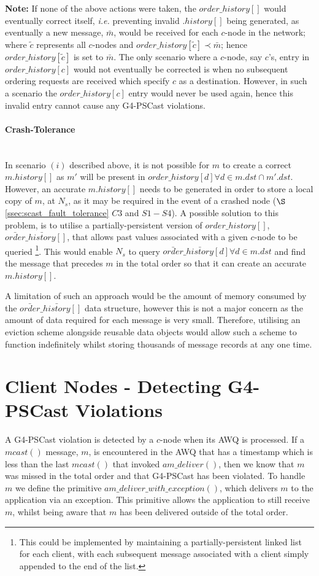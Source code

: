     \textbf{Note: } If none of the above actions were taken, the $order\_history[]$ would eventually correct itself, \emph{i.e.} preventing invalid $.history[]$ being generated, as eventually a new message, $\bar{m}$, would be received for each $c$-node in the network; where $\tilde{c}$ represents all $c$-nodes and $order\_history[\tilde{c}] \prec \bar{m}$; hence $order\_history[\tilde{c}]$ is set to $\bar{m}$.  The only scenario where a $c$-node, say $c$'s, entry in $order\_history[c]$ would not eventually be corrected is when no subsequent ordering requests are received which specify $c$ as a destination.  However, in such a scenario the $order\_history[c]$ entry would never be used again, hence this invalid entry cannot cause any G4-PSCast violations.  
    
    \paragraph{Crash-Tolerance} \hfill \\
    In scenario $(i)$ described above, it is not possible for $m$ to create a correct $m.history[]$ as $m'$ will be present in $order\_history[d] \forall d \in m.dst \cap m'.dst$.  However, an accurate $m.history[]$ needs to be generated in order to store a local copy of $m$, at $N_s$, as it may be required in the event of a crashed node ($\S$ \ref{ssec:scast_fault_tolerance} $C3$ and $S1-S4$).  A possible solution to this problem, is to utilise a partially-persistent version of $order\_history[]$, $\bar{order}\_\bar{history}[]$, that allows past values associated with a given $c$-node to be queried \footnote{This could be implemented by maintaining a partially-persistent linked list for each client, with each subsequent message associated with a client simply appended to the end of the list.}.  This would enable $N_s$ to query $\bar{order}\_\bar{history}[d] \forall d \in m.dst$ and find the message that precedes $m$ in the total order so that it can create an accurate $m.history[]$.
    
    A limitation of such an approach would be the amount of memory consumed by the $\bar{order}\_\bar{history}[]$ data structure, however this is not a major concern as the amount of data required for each message is very small.  Therefore, utilising an eviction scheme alongside reusable data objects would allow such a scheme to function indefinitely whilst storing thousands of message records at any one time.  

\section{Client Nodes - Detecting G4-PSCast Violations}
A G4-PSCast violation is detected by a $c$-node when its AWQ is processed.  If a $mcast()$ message, $m$, is encountered in the AWQ that has a timestamp which is less than the last $mcast()$ that invoked $am\_deliver()$, then we know that $m$ was missed in the total order and that G4-PSCast has been violated.  To handle $m$ we define the primitive $am\_deliver\_with\_exception()$, which delivers $m$ to the application via an exception.  This primitive allows the application to still receive $m$, whilst being aware that $m$ has been delivered outside of the total order.

